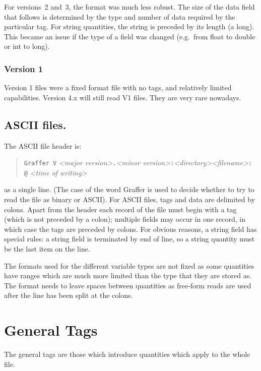 \documentclass[english]{article}
\begin{document}
For versions~2 and~3, the format was much less robust.
The size of the data field that follows is determined by the
type and number of data required by the particular tag. For string quantities,
the string is preceded by its length (a long). This became an issue if
the type of a field was changed (e.g.\ from float to double or int to long).

\subsubsection{Version 1}
\label{sec:vers1}

Version 1 files were a fixed format file with no tags, and relatively
limited capabilities. Version 4.x will still read V1 files. They are
very rare nowadays.

\subsection{ASCII files.}

The ASCII file header is:
\begin{quote}
  \texttt{Graffer V} \emph{<major version>}\texttt{.}\emph{<minor
    version>}\texttt{:}\emph{<directory><filename>}\texttt{: @}
  \emph{<time of writing>}
\end{quote}
as a single line. (The case of the word Graffer is used to decide
whether to try to read the file as binary or ASCII).
For ASCII files, tags and data are delimited by colons. Apart from
the header each record of the file must begin with a tag (which is
not preceded by a colon); multiple fields may occur in one record,
in which case the tags are preceded by colons. For obvious reasons,
a string field has special rules: a string field is terminated by
end of line, so a string quantity must be the last item on the line.


The formats used for the different variable types are not fixed as
some quantities have ranges which are much more limited than the type
that they are stored as. The format needs to leave spaces between quantities
as free-form reads are used after the line has been split at the colons.


\section{General Tags}

The general tags are those which introduce quantities which apply
to the whole file.
\end{document}
